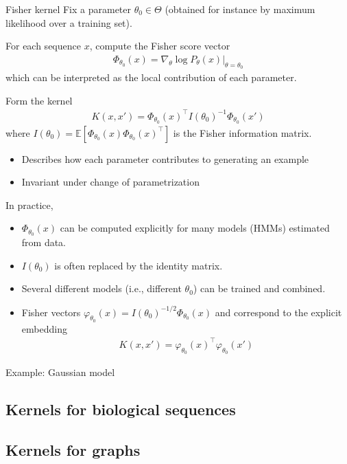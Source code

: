 \documentclass[10pt]{article}
\begin{document}
\begin{Definition}{Fisher kernel}{}
  Fix a parameter $\theta_0 \in \Theta$ (obtained for instance by maximum 
  likelihood over a training set).

  For each sequence $x$, compute the Fisher score vector
  \begin{align*}
    \Phi_{\theta_0}(x) = \nabla_\theta \log P_\theta(x)|_{\theta=\theta_0}
  \end{align*}
  which can be interpreted as the local contribution of each parameter.

  Form the kernel
  \begin{align*}
    K(x, x') = \Phi_{\theta_0}(x)^\top I(\theta_0)^{-1}\Phi_{\theta_0}(x')
  \end{align*}
  where $I(\theta_0) = \mathbb{E}[\Phi_{\theta_0}(x)\Phi_{\theta_0}(x)^\top]$ is 
  the Fisher information matrix.
\end{Definition}
\begin{itemize}
  \item Describes how each parameter contributes to generating an example
  \item Invariant under change of parametrization 
\end{itemize}
In practice,
\begin{itemize}
  \item $\Phi_{\theta_0}(x)$ can be computed explicitly for many models (HMMs)
  estimated from data.
  \item $I(\theta_0)$ is often replaced by the identity matrix. 
  \item Several different models (i.e., different $\theta_0$) can be trained and
  combined.
  \item Fisher vectors $\varphi_{\theta_0}(x) = 
  I(\theta_0)^{-1/2}\Phi_{\theta_0}(x)$ and correspond to the explicit 
  embedding 
  \begin{align}
    K(x, x') = \varphi_{\theta_0}(x)^\top \varphi_{\theta_0}(x')
  \end{align}
\end{itemize}

Example: Gaussian model 

\subsection{Kernels for biological sequences}
\subsection{Kernels for graphs}
\end{document}
